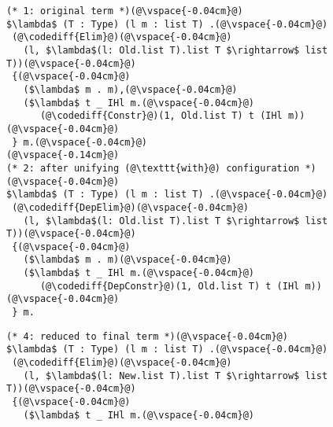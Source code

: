 \begin{figure}
\begin{minipage}{0.49\textwidth}
\begin{lstlisting}
(* 1: original term *)(@\vspace{-0.04cm}@)
$\lambda$ (T : Type) (l m : list T) .(@\vspace{-0.04cm}@)
 (@\codediff{Elim}@)(@\vspace{-0.04cm}@)
   (l, $\lambda$(l: Old.list T).list T $\rightarrow$ list T))(@\vspace{-0.04cm}@)
 {(@\vspace{-0.04cm}@)
   ($\lambda$ m . m),(@\vspace{-0.04cm}@)
   ($\lambda$ t _ IHl m.(@\vspace{-0.04cm}@)
      (@\codediff{Constr}@)(1, Old.list T) t (IHl m))(@\vspace{-0.04cm}@)
 } m.(@\vspace{-0.04cm}@)
(@\vspace{-0.14cm}@)
(* 2: after unifying (@\texttt{with}@) configuration *)(@\vspace{-0.04cm}@)
$\lambda$ (T : Type) (l m : list T) .(@\vspace{-0.04cm}@)
 (@\codediff{DepElim}@)(@\vspace{-0.04cm}@)
   (l, $\lambda$(l: Old.list T).list T $\rightarrow$ list T))(@\vspace{-0.04cm}@)
 {(@\vspace{-0.04cm}@)
   ($\lambda$ m . m)(@\vspace{-0.04cm}@)
   ($\lambda$ t _ IHl m.(@\vspace{-0.04cm}@)
      (@\codediff{DepConstr}@)(1, Old.list T) t (IHl m))(@\vspace{-0.04cm}@)
 } m.
\end{lstlisting}
\end{minipage}
\hfill
\begin{minipage}{0.49\textwidth}
\begin{lstlisting}
(* 4: reduced to final term *)(@\vspace{-0.04cm}@)
$\lambda$ (T : Type) (l m : list T) .(@\vspace{-0.04cm}@)
 (@\codediff{Elim}@)(@\vspace{-0.04cm}@)
   (l, $\lambda$(l: New.list T).list T $\rightarrow$ list T))(@\vspace{-0.04cm}@)
 {(@\vspace{-0.04cm}@)
   ($\lambda$ t _ IHl m.(@\vspace{-0.04cm}@)

\end{lstlisting}
\end{minipage}
\end{figure}
